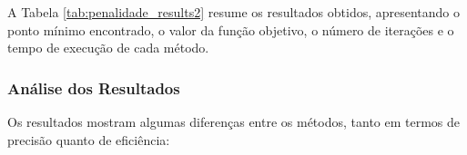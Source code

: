 \documentclass[a4paper, 12pt]{article}
\begin{document}
A Tabela \ref{tab:penalidade_results2} resume os resultados obtidos, apresentando o ponto mínimo encontrado, o valor da função objetivo, o número de iterações e o tempo de execução de cada método.

\begin{table}[h!]
    \centering
    \caption{Resultados dos Métodos OSR para o Método de Penalidade - Segundo Problema}
    \label{tab:penalidade_results2}
\end{table}

\subsubsection{Análise dos Resultados}

Os resultados mostram algumas diferenças entre os métodos, tanto em termos de precisão quanto de eficiência:
\end{document}
